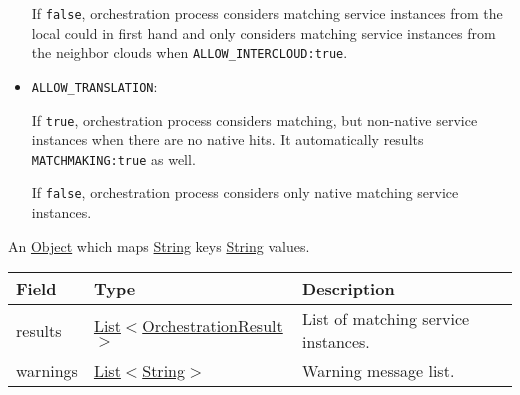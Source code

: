 \documentclass[a4paper]{arrowhead}
\newcommand{\pref}[1]{{\textcolor{ArrowheadGrey}{\hyperref[sec:model:primitives:#1]{#1}}}}
\begin{document}
\begin{itemize}
    If \texttt{false}, orchestration process considers matching service instances from the local could in first hand and only considers matching service instances from the neighbor clouds when \texttt{ALLOW\_INTERCLOUD:true}.
    
    \item \texttt{ALLOW\_TRANSLATION}:

    If \texttt{true}, orchestration process considers matching, but non-native service instances when there are no native hits. It automatically results \texttt{MATCHMAKING:true} as well.

     If \texttt{false}, orchestration process considers only native matching service instances.
    
\end{itemize}


An \pref{Object} which maps \pref{String} keys \pref{String} values.

 
\begin{table}[ht!]
\begin{tabularx}{\textwidth}{| p{3cm} | p{4.25cm} | X |} \hline
\rowcolor{gray!33} Field & Type & Description \\ \hline
results & \pref{List}$<$\hyperref[sec:model:OrchestrationResult]{OrchestrationResult}$>$ & List of matching service instances. \\ \hline
warnings & \pref{List}$<$\hyperref[sec:model:String]{String}$>$ & Warning message list. \\ \hline
\end{tabularx}
\end{table}

\end{document}
